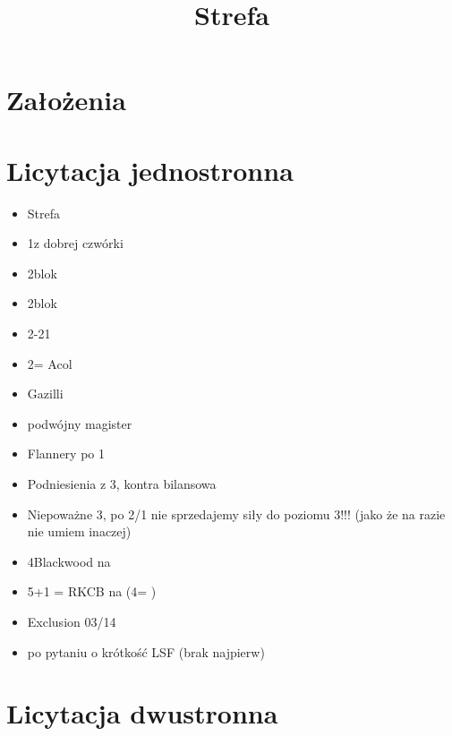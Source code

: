 \documentclass[12pt, a4paper]{report}
\title{\spades\clubs Strefa \xdiams\xhearts}
\begin{document}
\maketitle


\section*{\colorbox{Plum!30}{Założenia}}
 {

    \section*{\colorbox{blue!30}{Licytacja jednostronna}}
        \begin{itemize}
            \item Strefa
            \item 1\diams z dobrej czwórki
            \item 2\major \nat blok
            \item 2\diams \nat blok \imp
            \item 2-21 \bal
            \item 2\clubs = Acol
            \item Gazilli
            \item podwójny magister
            \item Flannery po 1\minor
            \item Podniesienia z 3, kontra bilansowa
            \item Niepoważne 3\nt, po 2/1 nie sprzedajemy siły do poziomu 3!!! 
            (jako że na razie nie umiem inaczej)
            \item 4\nt Blackwood na \major
            \item 5\minor+1 = RKCB na \minor (4\nt = \nat) \imp
            \item Exclusion 03/14
            \item po pytaniu o krótkość LSF (brak najpierw)
        \end{itemize}
    
    \section*{\colorbox{blue!30}{Licytacja dwustronna}}

}
\end{document}
